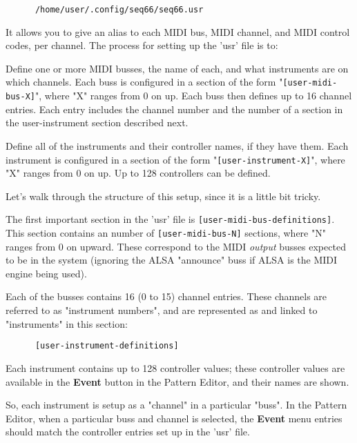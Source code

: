   \begin{verbatim}
      /home/user/.config/seq66/seq66.usr
   \end{verbatim}

   It allows you to give an alias to 
   each MIDI bus, MIDI channel, and MIDI control 
   codes, per channel.
   The process for setting up the 'usr' file is to:

   \begin{enumber}
      \item Define one or more MIDI busses, the name of each, and what
         instruments are on which channels.  Each buss is configured in a
         section of the form "\texttt{[user-midi-bus-X]}", where "X" ranges
         from 0 on up.  Each buss then defines up to 16 channel entries.
         Each entry includes the channel number and the number of a
         section in the user-instrument section described next.
      \item Define all of the instruments and their controller
         names, if they have them.  Each instrument is configured in a
         section of the form "\texttt{[user-instrument-X]}", where "X"
         ranges from 0 on up.  Up to 128 controllers can be defined.
   \end{enumber}

   Let's walk through the structure of this setup, since it is a little bit
   tricky.

   The first important section in the 'usr' file
   is \texttt{[user-midi-bus-definitions]}.
   This section contains an number
   of \texttt{[user-midi-bus-N]} sections, where "N" ranges from 0 on upward.
   These correspond to the MIDI \textsl{output}
   busses expected to be in the system (ignoring the ALSA "announce" buss if
   ALSA is the MIDI engine being used).

   Each of the busses contains 16 (0 to 15) channel entries.
   These channels are referred to as "instrument numbers", and are
   represented as and linked to "instruments" in this section:

   \begin{verbatim}
      [user-instrument-definitions]
   \end{verbatim}

   Each instrument contains up
   to 128 controller values; these controller values are available in the
   \textbf{Event} button in the Pattern Editor, and their names are shown.

   So, each instrument is setup as a "channel" in a particular "buss".
   In the Pattern Editor, when a particular buss and channel is selected,
   the \textbf{Event} menu entries should match the controller entries set up
   in the 'usr' file.


